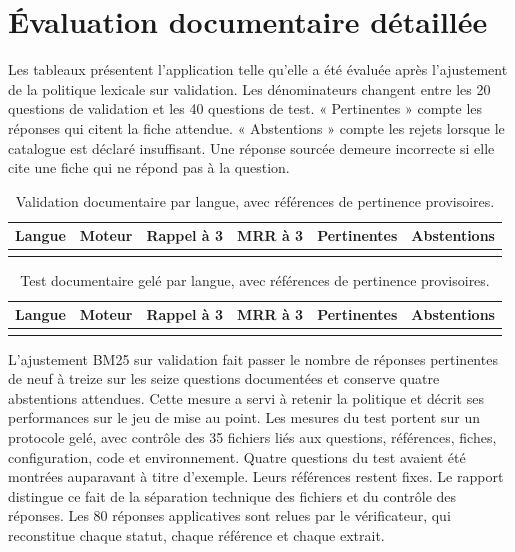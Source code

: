 \section{Évaluation documentaire détaillée}\label{ann:documentaire}

Les tableaux présentent l’application telle qu’elle a été évaluée après l’ajustement de la politique lexicale sur validation. Les dénominateurs changent entre les 20 questions de validation et les 40 questions de test. « Pertinentes » compte les réponses qui citent la fiche attendue. « Abstentions » compte les rejets lorsque le catalogue est déclaré insuffisant. Une réponse sourcée demeure incorrecte si elle cite une fiche qui ne répond pas à la question.

\begin{table}[htbp]
\centering\small
\caption{Validation documentaire par langue, avec références de pertinence provisoires.}
\begin{tabularx}{\linewidth}{@{}Ylrrrr@{}}
\toprule
Langue & Moteur & Rappel à 3 & MRR à 3 & Pertinentes & Abstentions \\
\midrule
{}
\bottomrule
\end{tabularx}
\end{table}

\begin{table}[htbp]
\centering\small
\caption{Test documentaire gelé par langue, avec références de pertinence provisoires.}
\begin{tabularx}{\linewidth}{@{}Ylrrrr@{}}
\toprule
Langue & Moteur & Rappel à 3 & MRR à 3 & Pertinentes & Abstentions \\
\midrule
{}
\bottomrule
\end{tabularx}
\end{table}

L’ajustement BM25 sur validation fait passer le nombre de réponses pertinentes de neuf à treize sur les seize questions documentées et conserve quatre abstentions attendues. Cette mesure a servi à retenir la politique et décrit ses performances sur le jeu de mise au point. Les mesures du test portent sur un protocole gelé, avec contrôle des 35 fichiers liés aux questions, références, fiches, configuration, code et environnement. Quatre questions du test avaient été montrées auparavant à titre d’exemple. Leurs références restent fixes. Le rapport distingue ce fait de la séparation technique des fichiers et du contrôle des réponses. Les 80 réponses applicatives sont relues par le vérificateur, qui reconstitue chaque statut, chaque référence et chaque extrait.

